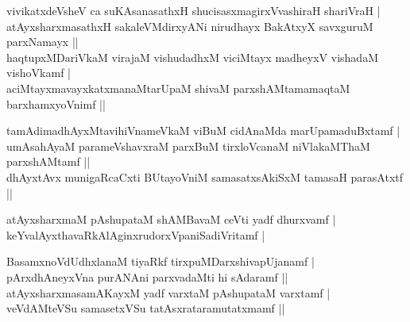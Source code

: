 \begin{entry}
\smallskip
\begin{shl}
vivikatxdeVsheV ca suKAsanasathxH shucisasxmagirxVvashiraH shariVraH |\\[1pt]
atAyxsharxmasathxH sakaleVMdirxyANi nirudhayx BakAtxyX savxguruM parxNamayx ||\\[1pt]
haqtupxMDariVkaM virajaM vishudadhxM viciMtayx madheyxV vishadaM vishoVkamf |\\[1pt]
aciMtayxmavayxkatxmanaMtarUpaM shivaM parxshAMtamamaqtaM barxhamxyoVnimf ||
\end{shl}
\begin{shl}
tamAdimadhAyxMtavihiVnameVkaM viBuM cidAnaMda marUpamaduBxtamf |\\[1pt]
umAsahAyaM parameVshavxraM parxBuM tirxloVcanaM niVlakaMThaM parxshAMtamf ||\\[1pt]
dhAyxtAvx munigaRcaCxti BUtayoVniM samasatxsAkiSxM tamasaH parasAtxtf ||
\end{shl}
\medskip
{}
\smallskip
\begin{shl}
atAyxsharxmaM pAshupataM shAMBavaM ceVti yadf dhurxvamf |\\[1pt]
keYvalAyxthavaRkAlAginxrudorxVpaniSadiVritamf |
\end{shl}
\medskip
{}
\smallskip
{}
\smallskip
\begin{shl}
BasamxnoVdUdhxlanaM tiyaRkf tirxpuMDarxshivapUjanamf |\\[1pt]
pArxdhAneyxVna purANAni parxvadaMti hi sAdaramf ||\\[1pt]
atAyxsharxmasamAKayxM yadf varxtaM pAshupataM varxtamf |\\[1pt]
veVdAMteVSu samasetxVSu tatAsxrataramutatxmamf ||
\end{shl}
\medskip
{}
\smallskip
{}
\smallskip
{}
\end{entry}

